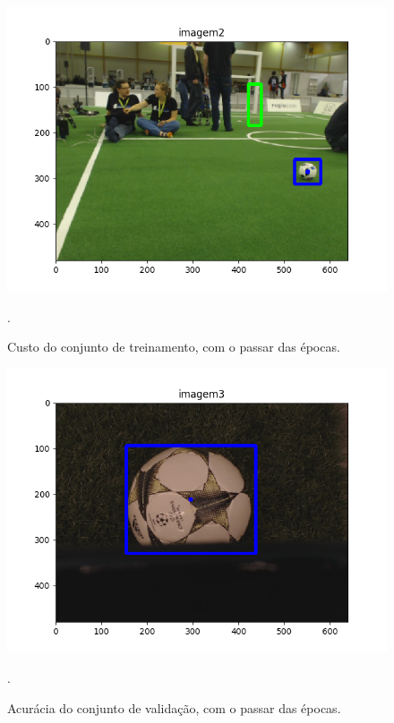 \documentclass[conference]{IEEEtran}
\begin{document}
\begin{figure}[htbp]
\centering
\centerline{\includegraphics[scale=0.5]{imagens/imagem2_detection.png}}
\caption{Custo do conjunto de treinamento, com o passar das épocas.}.
\label{imagem2_detection}
\end{figure}

\begin{figure}[htbp]
\centering
\centerline{\includegraphics[scale=0.5]{imagens/imagem3_detection.png}}
\caption{Acurácia do conjunto de validação, com o passar das épocas.}.
\label{imagem3_detection}
\end{figure}
\end{document}
